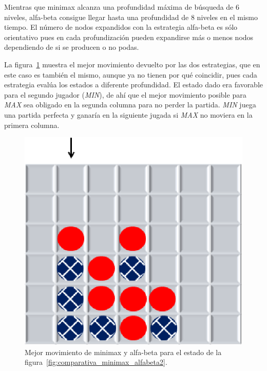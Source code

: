Mientras que minimax alcanza una profundidad máxima de búsqueda de 6 niveles, alfa-beta consigue llegar hasta una profundidad de 8 niveles en el mismo tiempo.
El número de nodos expandidos con la estrategia alfa-beta es sólo orientativo pues en cada profundización pueden expandirse más o menos nodos dependiendo de si se producen o no podas.


La figura~\ref{fig:comparativa_minimax_alfabeta2Movimiento} muestra el mejor movimiento devuelto por las dos estrategias, que en este caso es también el mismo, aunque ya no tienen por qué coincidir, pues cada estrategia evalúa los estados a diferente profundidad.
El estado dado era favorable para el segundo jugador (\textit{MIN}), de ahí que el mejor movimiento posible para \textit{MAX} sea obligado en la segunda columna para no perder la partida.
\textit{MIN} juega una partida perfecta y ganaría en la siguiente jugada si \textit{MAX} no moviera en la primera columna.

\begin{figure}[!h]
	\centering
	\includegraphics[scale=0.4]{contenido/cap7/imagenes/ckEstadoActualMovimiento.eps}
	\caption[Mejor movimiento de minimax y alfa-beta en el Conecta-4 (II)]{Mejor movimiento de minimax y alfa-beta para el estado de la figura~\ref{fig:comparativa_minimax_alfabeta2}.}
	\label{fig:comparativa_minimax_alfabeta2Movimiento}
\end{figure} 

